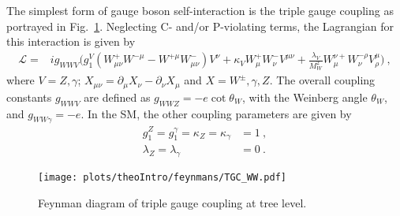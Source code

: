 The simplest form of gauge boson self-interaction is the triple gauge coupling as portrayed in Fig.~\ref{fig:theo:tgc}. Neglecting C- and/or P-violating terms, the Lagrangian for this interaction is given by \cite{EFT}
\begin{align}
\mathcal{L} =& ig_{WWV}\Big( g_1^V(W_{\mu\nu}^+W^{-\mu} - W^{+\mu}W_{\mu\nu}^-)V^{\nu} + \kappa_VW_\mu^+W_\nu^-V^{\mu\nu}  + \frac{\lambda_V}{M_W^2}W_\mu^{\nu+}W_\nu^{-\rho}V_\rho^\mu  \Big) ~, \label{eq:theo:EWKlag}
\end{align}
where $V=Z,\gamma$; $X_{\mu\nu}=\partial_\mu X_\nu -\partial_\nu X_\mu$ and $X=W^\pm,\gamma ,Z$. The overall coupling constants $g_{WWV}$ are defined as $g_{WWZ} = -e \cot \theta_W$, with the Weinberg angle $\theta_W$, and  $g_{WW\gamma} =-e$. In the SM, the other coupling parameters are given by
\begin{align}
g_1^Z = g_1^\gamma = \kappa_Z = \kappa_\gamma &= 1 ~, \\
\lambda_Z = \lambda_\gamma &= 0 ~.
\end{align}
\begin{figure}
	\centering
	\texttt{[image: plots/theoIntro/feynmans/TGC\_WW.pdf]}
	\caption[Feynman diagram of triple gauge coupling at tree level]{Feynman diagram of triple gauge coupling at tree level.}
	\label{fig:theo:tgc}
\end{figure}

